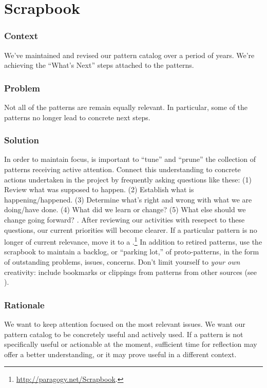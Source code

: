 \section{Scrapbook} \label{sec:Scrapbook}

\subsubsection*{Context} We've maintained and revised our pattern catalog over a period of years.  We're achieving
the ``What's Next'' steps attached to the patterns.

\subsubsection*{Problem} Not all of the patterns are remain equally relevant.  In particular, some of the patterns no longer lead to concrete next steps.

\subsubsection*{Solution} In order to maintain focus, is important to ``tune'' and ``prune'' the collection of patterns receiving active attention.  Connect this understanding to concrete actions undertaken in the project by frequently asking questions like these:
(1) Review what was supposed to happen.
(2) Establish what is happening/happened.
(3) Determine what’s right and wrong with what we are doing/have done.
(4) What did we learn or change? 
(5) What else should we change going forward?  \cite[Chapter 28]{peeragogy-handbook}.
%
After reviewing our activities with resepect to these questions, our
current priorities will become clearer.  If a particular pattern is no
longer of current relevance, move it to a
.\footnote{\url{http://paragogy.net/Scrapbook}.}  In addition
to retired patterns, use the scrapbook to maintain a backlog, or
``parking lot,'' of proto-patterns, in the form of outstanding
problems, issues, concerns.  Don't limit yourself to \emph{your own}
creativity: include bookmarks or clippings from patterns from other
sources (see ).

\subsubsection*{Rationale} We want to keep attention focused on the most relevant issues.
We want our pattern catalog to be concretely useful and actively used.
If a pattern is not specifically useful or actionable at the
moment, sufficient time for reflection may offer a better
understanding, or it may prove useful in a different context.

